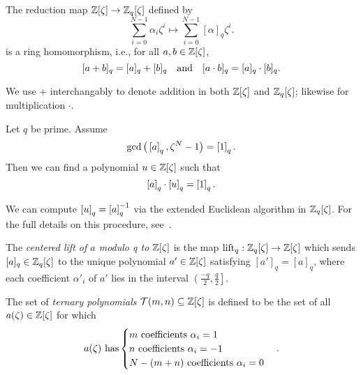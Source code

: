 \documentclass[10pt,reqno]{article}
\begin{document}
\begin{proposition}\label{prop:reductionhomomorphism}
    The reduction map $\mathbb{Z}[\zeta] \to \mathbb{Z}_q[\zeta]$ defined by 
    \[\sum_{i=0}^{N-1} \alpha_i \zeta^i \mapsto \sum_{i=0}^{N-1} [\alpha]_q \zeta^{i}.\]
    is a ring homomorphism, i.e., for all $a, b \in \mathbb{Z}[\zeta]$,
        \[ [a + b]_q = [a]_q + [b]_q \quad \textnormal{and} \quad [a \cdot b]_q = [a]_q \cdot [b]_q.\]
\end{proposition}


\begin{remark*}
We use $+$ interchangably to denote addition in both $\mathbb{Z}[\zeta]$ and $\mathbb{Z}_q[\zeta]$; likewise for multiplication $\cdot$.
    \begin{comment}
Furthermore, we identify $\Z$ as a subset of $\Z[\zeta]$ and $\Z_q$ as a subset $\Z_q[\zeta]$.\footnote{This means, for example, that we can treat $a \in \Z$ as the constant polynomial $a\zeta^0 \in \Z[\zeta]$.}
    \end{comment}
    \end{remark*}


\begin{proposition}\label{prop:modularinverse}
    Let $q$ be prime.  Assume 
    \[\gcd\big(\left[{a}\right]_{{q}}, \zeta^N-1 \big) = \left[{1}\right]_{{q}}.\] 
    Then we can find a polynomial $u \in \mathbb{Z}[\zeta]$ such that
    \[\left[{a}\right]_{{q}}\cdot \left[{u}\right]_{{q}} = \left[{1}\right]_{{q}}.\]
\end{proposition}


\begin{remark*}
    We can compute $\left[{u}\right]_{{q}}=\left[{a}\right]_{{q}}^{-1}$ via the extended Euclidean algorithm in $\mathbb{Z}_q[\zeta]$. For the full details on this procedure, see~\cite[page 391]{Pipher_josephh.}.
\end{remark*}


\begin{definition}\label{def:lift}
    The \emph{centered lift of $a$ modulo q to $\mathbb{Z}[\zeta]$} is the map $\mathrm{lift}_q:\mathbb{Z}_q[\zeta] \to \mathbb{Z}[\zeta]$ which sends 
    $[a]_q \in \mathbb{Z}_q[\zeta]$ to the unique polynomial $a' \in \mathbb{Z}[\zeta]$ satisfying $[a']_q = [a]_q$, 
    where each coefficient $\alpha'_i$ of $a'$ lies in the interval $\left(\frac{-q}{2},\frac{q}{2} \right]$.
\end{definition}


\begin{definition}\label{def:ternarypoly}
    The set of \emph{ternary polynomials} $\mathcal{T}(m,n) \subseteq \mathbb{Z}[\zeta]$ is defined to be the set of all $a(\zeta) \in \mathbb{Z}[\zeta]$ for which 
    \[a(\zeta) \ \textnormal{has} \begin{cases}\textnormal{$m$ coefficients $\alpha_i=1$}\\
    \textnormal{$n$ coefficients $\alpha_i=-1$} \\
    \textnormal{$N-(m+n)$ coefficients $\alpha_i=0$}\end{cases}.\]
\end{definition}
\end{document}
